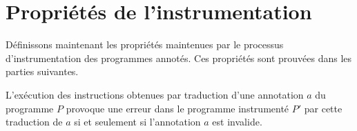 







\section{Propriétés de l'instrumentation}
\label{sec:properties}


Définissons maintenant les propriétés maintenues par le processus
d'instrumentation des programmes annotés.
Ces propriétés sont prouvées dans les parties suivantes.


\begin{myproperty}
  \label{th:error}
  L'exécution des instructions obtenues par traduction d'une annotation $a$ du
  programme $P$ provoque une erreur dans le programme instrumenté $P'$ par cette
  traduction de $a$ si et seulement si l'annotation $a$ est invalide.
\end{myproperty}

